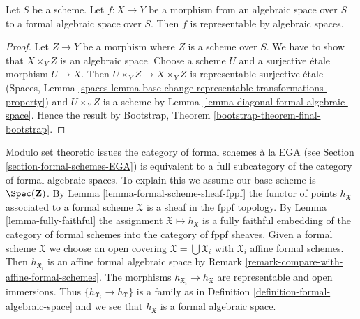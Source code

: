 \begin{lemma}
\label{lemma-space-to-formal-space}
Let $S$ be a scheme. Let $f : X \to Y$ be a morphism from an
algebraic space over $S$ to a formal algebraic space over $S$.
Then $f$ is representable by algebraic spaces.
\end{lemma}

\begin{proof}
Let $Z \to Y$ be a morphism where $Z$ is a scheme over $S$.
We have to show that $X \times_Y Z$ is an algebraic space.
Choose a scheme $U$ and a surjective \'etale morphism $U \to X$.
Then $U \times_Y Z \to X \times_Y Z$ is representable surjective \'etale
(Spaces, Lemma
\ref{spaces-lemma-base-change-representable-transformations-property})
and $U \times_Y Z$ is a scheme by
Lemma \ref{lemma-diagonal-formal-algebraic-space}.
Hence the result by
Bootstrap, Theorem \ref{bootstrap-theorem-final-bootstrap}.
\end{proof}

\begin{remark}
\label{remark-compare-with-formal-schemes}
Modulo set theoretic issues the category of formal schemes \`a la EGA
(see Section \ref{section-formal-schemes-EGA}) is equivalent to a full
subcategory of the category of formal algebraic spaces. To explain this
we assume our base scheme is $\Spec(\mathbf{Z})$. By
Lemma \ref{lemma-formal-scheme-sheaf-fppf} the functor of points
$h_\mathfrak X$ associated to a formal scheme $\mathfrak X$ is a sheaf
in the fppf topology. By Lemma \ref{lemma-fully-faithful}
the assignment $\mathfrak X \mapsto h_\mathfrak X$ is a fully faithful
embedding of the category of formal schemes into the category of
fppf sheaves. Given a formal scheme $\mathfrak X$ we choose an open covering
$\mathfrak X = \bigcup \mathfrak X_i$ with $\mathfrak X_i$
affine formal schemes. Then $h_{\mathfrak X_i}$
is an affine formal algebraic space by
Remark \ref{remark-compare-with-affine-formal-schemes}.
The morphisms $h_{\mathfrak X_i} \to h_\mathfrak X$ are representable
and open immersions. Thus $\{h_{\mathfrak X_i} \to h_\mathfrak X\}$
is a family as in Definition \ref{definition-formal-algebraic-space}
and we see that $h_\mathfrak X$ is a formal algebraic space.
\end{remark}

